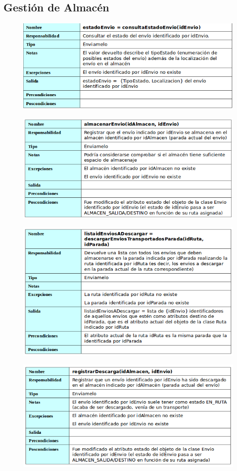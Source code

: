 \subsection{Gestión de Almacén}
\begin{figure}[H]
	\centering
	\includegraphics[width=16cm]{8}
\end{figure}
\begin{figure}[H]
	\centering
	\includegraphics[width=16cm]{9}
\end{figure}
\begin{figure}[H]
	\centering
	\includegraphics[width=16cm]{10}
\end{figure}
\begin{figure}[H]
	\centering
	\includegraphics[width=16cm]{11}
\end{figure}
